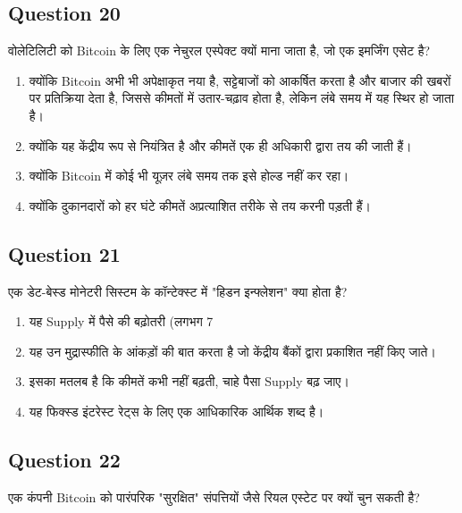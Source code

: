 \documentclass[12pt,a4paper]{article}
\begin{document}
\bigskip


\subsection*{Question 20}
वोलेटिलिटी को Bitcoin के लिए एक नेचुरल एस्पेक्ट क्यों माना जाता है, जो एक इमर्जिंग एसेट है?

\begin{enumerate}[label=\Alph*., leftmargin=*]
\item क्योंकि Bitcoin अभी भी अपेक्षाकृत नया है, सट्टेबाजों को आकर्षित करता है और बाजार की खबरों पर प्रतिक्रिया देता है, जिससे कीमतों में उतार-चढ़ाव होता है, लेकिन लंबे समय में यह स्थिर हो जाता है।
\item क्योंकि यह केंद्रीय रूप से नियंत्रित है और कीमतें एक ही अधिकारी द्वारा तय की जाती हैं।
\item क्योंकि Bitcoin में कोई भी यूज़र लंबे समय तक इसे होल्ड नहीं कर रहा।
\item क्योंकि दुकानदारों को हर घंटे कीमतें अप्रत्याशित तरीके से तय करनी पड़ती हैं।
\end{enumerate}

\bigskip


\subsection*{Question 21}
एक डेट-बेस्ड मोनेटरी सिस्टम के कॉन्टेक्स्ट में "हिडन इन्फ्लेशन" क्या होता है?

\begin{enumerate}[label=\Alph*., leftmargin=*]
\item यह Supply में पैसे की बढ़ोतरी (लगभग 7%
\item यह उन मुद्रास्फीति के आंकड़ों की बात करता है जो केंद्रीय बैंकों द्वारा प्रकाशित नहीं किए जाते।
\item इसका मतलब है कि कीमतें कभी नहीं बढ़ती, चाहे पैसा Supply बढ़ जाए।
\item यह फिक्स्ड इंटरेस्ट रेट्स के लिए एक आधिकारिक आर्थिक शब्द है।
\end{enumerate}

\bigskip


\subsection*{Question 22}
एक कंपनी Bitcoin को पारंपरिक "सुरक्षित" संपत्तियों जैसे रियल एस्टेट पर क्यों चुन सकती है?
\end{document}
